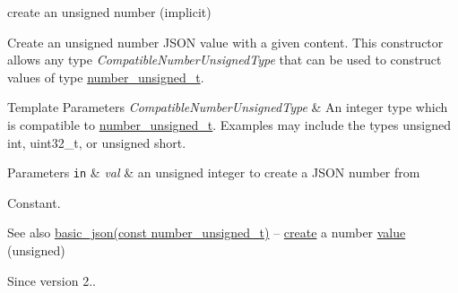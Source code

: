 create an unsigned number (implicit) 

Create an unsigned number J\+S\+ON value with a given content. This constructor allows any type {\itshape Compatible\+Number\+Unsigned\+Type} that can be used to construct values of type \hyperlink{classnlohmann_1_1basic__json_a60a04166c122072ab11eaf9845d9cd1d}{number\+\_\+unsigned\+\_\+t}.


\begin{DoxyTemplParams}{Template Parameters}
{\em Compatible\+Number\+Unsigned\+Type} & An integer type which is compatible to \hyperlink{classnlohmann_1_1basic__json_a60a04166c122072ab11eaf9845d9cd1d}{number\+\_\+unsigned\+\_\+t}. Examples may include the types {\ttfamily unsigned int}, {\ttfamily uint32\+\_\+t}, or {\ttfamily unsigned short}.\\
\hline
\end{DoxyTemplParams}

\begin{DoxyParams}[1]{Parameters}
\mbox{\tt in}  & {\em val} & an unsigned integer to create a J\+S\+ON number from\\
\hline
\end{DoxyParams}
Constant.

\begin{DoxySeeAlso}{See also}
\hyperlink{classnlohmann_1_1basic__json_a85b09b03916d3d1e73373f49cdd4136d}{basic\+\_\+json(const number\+\_\+unsigned\+\_\+t)} -- \hyperlink{classnlohmann_1_1basic__json_afdb7a485369fbfd8c4c7c134ebb1feb5}{create} a number \hyperlink{classnlohmann_1_1basic__json_a407e73a037e6e3067ef7aa2c25a79f39}{value} (unsigned)
\end{DoxySeeAlso}
\begin{DoxySince}{Since}
version 2.. 
\end{DoxySince}
\hypertarget{classnlohmann_1_1basic__json_a2badcf191deabf579abcf8d3654da26f}{}\label{classnlohmann_1_1basic__json_a2badcf191deabf579abcf8d3654da26f} 
